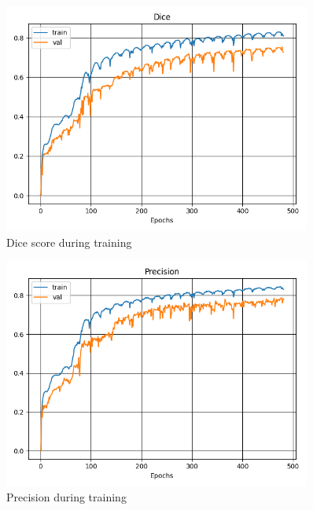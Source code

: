 \begin{figure}[!htb]
    \centering
    \includegraphics[width=0.9\textwidth]{images/plots/Dice.png}
    \caption{Dice score during training}
    \label{fig::Dice}
\end{figure}



\begin{figure}[!htb]
    \centering
    \includegraphics[width=0.9\textwidth]{images/plots/Precision.png}
    \caption{Precision during training}
    \label{fig::Precision}
\end{figure}

